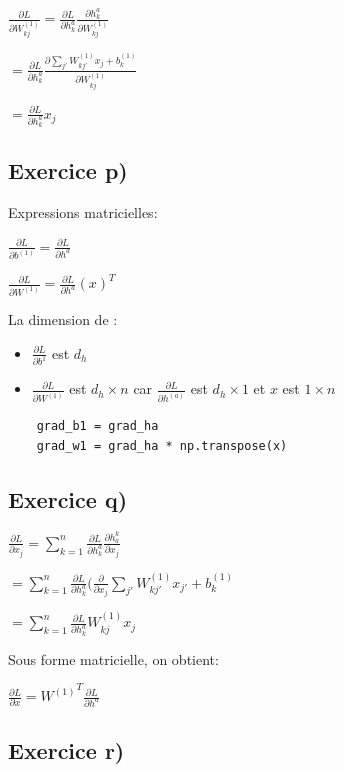 \documentclass[a4paper,10pt]{article}
\begin{document}
$\frac{\partial L}{\partial W^{(1)}_{kj}} = \frac{\partial L}{\partial h^{a}_{k}} \frac{\partial h^{a}_{k}}{\partial W^{(1)}_{kj}} $

$ = \frac{\partial L}{\partial h^{a}_{k}} \frac{\partial \sum_{j'} W^{(1)}_{kj'} x_{j} + b^{(1)}_{k}}{\partial W^{(1)}_{kj}}$

$ = \frac{\partial L}{\partial h^{a}_{k}} x_{j} $


\subsection{Exercice p)}

Expressions matricielles:

$\frac{\partial L}{\partial b^{(1)}} = \frac{\partial L}{\partial h^a}$

$\frac{\partial L}{\partial W^{(1)}} = \frac{\partial L}{\partial h^a}(x)^T$

La dimension de :
\begin{itemize}
	\item $\frac{\partial L}{\partial b^{1}}$ est $d_{h}$
	\item $\frac{\partial L}{\partial W^{(1)}}$ est $d_{h} \times n$ car  $\frac{\partial L}{\partial h^{(a)}}$ est $d_{h} \times 1$ et $ x $ est $1 \times n$
\end{itemize}

\begin{verbatim}
	grad_b1 = grad_ha
	grad_w1 = grad_ha * np.transpose(x)
\end{verbatim}


\subsection{Exercice q)}

$\frac{\partial L}{\partial x_j} = \sum_{k=1}^{n} \frac{\partial L}{\partial h_k^a} \frac{\partial h_a^k}{\partial x_j}$

$ = \sum_{k=1}^{n} \frac{\partial L}{\partial h_k^a} (\frac{\partial }{\partial x_j} \sum_{j'} W^{(1)}_{kj'} x_{j'} + b^{(1)}_k$

$ = \sum_{k=1}^{n} \frac{\partial L}{\partial h_k^a} W^{(1)}_{kj} x_{j}$

Sous forme matricielle, on obtient:

$\frac{\partial L}{\partial x} = {W^{(1)}}^T \frac{\partial L}{\partial h^a}$



\subsection{Exercice r)}
\end{document}
